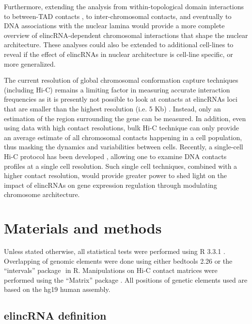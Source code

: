 \documentclass[11pt,a4paper]{report}
\begin{document}
Furthermore, extending the analysis from within-topological domain interactions to between-TAD contacts \cite{Fraser2015}⁠, to inter-chromosomal contacts, and eventually to DNA associations with the nuclear lamina would provide a more complete overview of elincRNA-dependent chromosomal interactions that shape the nuclear architecture. These analyses could also be extended to additional cell-lines to reveal if the effect of elincRNAs in nuclear architecture is cell-line specific, or more generalized. 

The current resolution of global chromosomal conformation capture techniques (including Hi-C) remains a limiting factor in measuring accurate interaction frequencies as it is presently not possible to look at contacts at elincRNAs loci that are smaller than the highest resolution (i.e. 5 Kb) \cite{Rao2014}⁠. Instead, only an estimation of the region surrounding the gene can be measured. In addition, even using data with high contact resolutions, bulk Hi-C technique can only provide an average estimate of all chromosomal contacts happening in a cell population, thus masking the dynamics and variabilities between cells. Recently, a single-cell Hi-C protocol has been developed \cite{Nagano2013}⁠, allowing one to examine DNA contacts profiles at a single cell resolution. Such single cell techniques, combined with a higher contact resolution, would provide greater power to shed light on the impact of elincRNAs on gene expression regulation through modulating chromosome architecture.

\section*{Materials and methods}
Unless stated otherwise, all statistical tests were performed using R 3.3.1 \cite{RCoreTeam2016}⁠. Overlapping of genomic elements were done using either bedtools 2.26 \cite{Quinlan2010}⁠or the “intervals” package \cite{Bourgon2015}⁠ in R. Manipulations on Hi-C contact matrices were performed using the “Matrix” package \cite{Bates2016}⁠. All positions of genetic elements used are based on the hg19 human assembly.

\subsection*{elincRNA definition}
\end{document}
